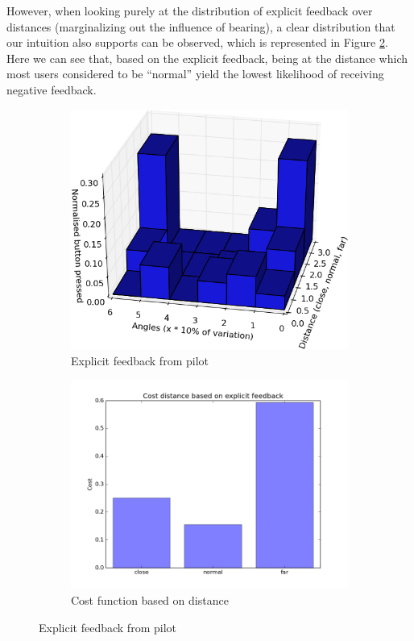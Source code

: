 \documentclass[a4paper,11pt]{report}
\begin{document}
However, when looking purely at the distribution of explicit feedback over distances (marginalizing out the influence of bearing), a clear distribution that our intuition also supports can be observed, which is represented in Figure \ref{fig:distance_cost}. Here we can see that, based on the explicit feedback, being at the distance which most users considered to be ``normal'' yield the lowest likelihood of receiving negative feedback.

\begin{figure}
    \centering
    \begin{subfigure}[b]{0.45\textwidth}
        \includegraphics[width=\textwidth]{figures/key_presses_normalised_cropped.png}
        \caption{Explicit feedback from pilot}
        \label{fig:button_presses}
    \end{subfigure}
    \begin{subfigure}[b]{0.45\textwidth}
        \includegraphics[width=\textwidth]{figures/Distance_cost.png}
        \caption{Cost function based on distance}
        \label{fig:distance_cost}
    \end{subfigure}
    \caption{Explicit feedback from pilot}
    \label{fig:button_presses_cost}
\end{figure}
\end{document}
